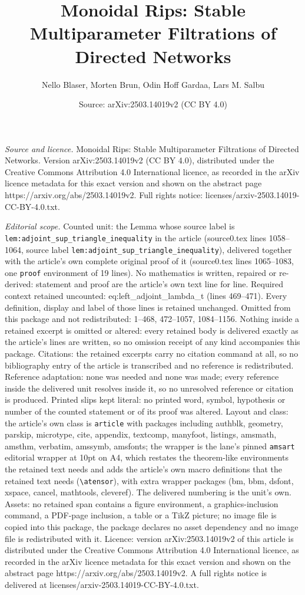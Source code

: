 \documentclass[10pt,a4paper]{amsart}
\title[Monoidal Rips: Stable Multiparameter Filtrations of Directed]{Monoidal Rips: Stable Multiparameter Filtrations of Directed Networks}
\author{Nello Blaser, Morten Brun, Odin Hoff Gardaa, Lars M. Salbu}
\date{Source: arXiv:2503.14019v2 (CC BY 4.0)}
\begin{document}
\maketitle

\noindent\emph{Source and licence.} Monoidal Rips: Stable Multiparameter Filtrations of Directed Networks. Version arXiv:2503.14019v2 (CC BY 4.0), distributed under the Creative Commons Attribution 4.0 International licence, as recorded in the arXiv licence metadata for this exact version and shown on the abstract page https://arxiv.org/abs/2503.14019v2. Full rights notice: licenses/arxiv-2503.14019-CC-BY-4.0.txt.\par\smallskip

\noindent\textit{Editorial scope.} Counted unit: the Lemma whose source label is \texttt{lem:adjoint\_sup\_triangle\_inequality} in the article (source0.tex lines 1058--1064, source label \texttt{lem:adjoint\_sup\_triangle\_inequality}), delivered together with the article's own complete original proof of it (source0.tex lines 1065--1083, one \texttt{proof} environment of 19 lines). No mathematics is written, repaired or re-derived: statement and proof are the article's own text line for line. Required context retained uncounted: eq:left\_adjoint\_lambda\_t (lines 469--471). Every definition, display and label of those lines is retained unchanged. Omitted from this package and not redistributed: 1--468, 472--1057, 1084--1156. Nothing inside a retained excerpt is omitted or altered: every retained body is delivered exactly as the article's lines are written, so no omission receipt of any kind accompanies this package. Citations: the retained excerpts carry no citation command at all, so no bibliography entry of the article is transcribed and no reference is redistributed. Reference adaptation: none was needed and none was made; every reference inside the delivered unit resolves inside it, so no unresolved reference or citation is produced. Printed slips kept literal: no printed word, symbol, hypothesis or number of the counted statement or of its proof was altered. Layout and class: the article's own class is \texttt{article} with packages including authblk, geometry, parskip, microtype, cite, appendix, textcomp, manyfoot, listings, amsmath, amsthm, verbatim, amssymb, amsfonts; the wrapper is the lane's pinned \texttt{amsart} editorial wrapper at 10pt on A4, which restates the theorem-like environments the retained text needs and adds the article's own macro definitions that the retained text needs (\texttt{\textbackslash atensor}), with extra wrapper packages (bm, bbm, dsfont, xspace, cancel, mathtools, cleveref). The delivered numbering is the unit's own. Assets: no retained span contains a figure environment, a graphics-inclusion command, a PDF-page inclusion, a table or a TikZ picture; no image file is copied into this package, the package declares no asset dependency and no image file is redistributed with it. Licence: version arXiv:2503.14019v2 of this article is distributed under the Creative Commons Attribution 4.0 International licence, as recorded in the arXiv licence metadata for this exact version and shown on the abstract page https://arxiv.org/abs/2503.14019v2. A full rights notice is delivered at licenses/arxiv-2503.14019-CC-BY-4.0.txt. 
\end{document}
